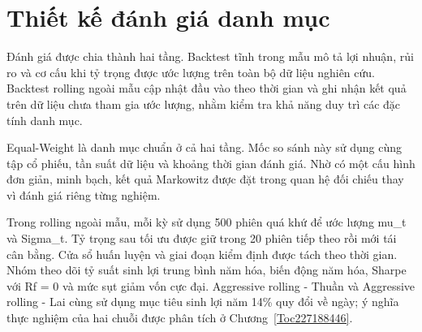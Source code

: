 \documentclass[12pt,a4paper,openany,oneside]{book}
\begin{document}
\section{Thiết kế đánh giá danh mục}\label{Toc227188445}
Đánh giá được chia thành hai tầng. Backtest tĩnh trong mẫu mô tả lợi nhuận, rủi ro và cơ cấu khi tỷ trọng được ước lượng trên toàn bộ dữ liệu nghiên cứu. Backtest rolling ngoài mẫu cập nhật đầu vào theo thời gian và ghi nhận kết quả trên dữ liệu chưa tham gia ước lượng, nhằm kiểm tra khả năng duy trì các đặc tính danh mục.

Equal-Weight là danh mục chuẩn ở cả hai tầng. Mốc so sánh này sử dụng cùng tập cổ phiếu, tần suất dữ liệu và khoảng thời gian đánh giá. Nhờ có một cấu hình đơn giản, minh bạch, kết quả Markowitz được đặt trong quan hệ đối chiếu thay vì đánh giá riêng từng nghiệm.

Trong rolling ngoài mẫu, mỗi kỳ sử dụng 500 phiên quá khứ để ước lượng mu\_t và Sigma\_t. Tỷ trọng sau tối ưu được giữ trong 20 phiên tiếp theo rồi mới tái cân bằng. Cửa sổ huấn luyện và giai đoạn kiểm định được tách theo thời gian. Nhóm theo dõi tỷ suất sinh lợi trung bình năm hóa, biến động năm hóa, Sharpe với Rf = 0 và mức sụt giảm vốn cực đại. Aggressive rolling - Thuần và Aggressive rolling - Lai cùng sử dụng mục tiêu sinh lợi năm 14\% quy đổi về ngày; ý nghĩa thực nghiệm của hai chuỗi được phân tích ở Chương~\ref{Toc227188446}.
\end{document}
